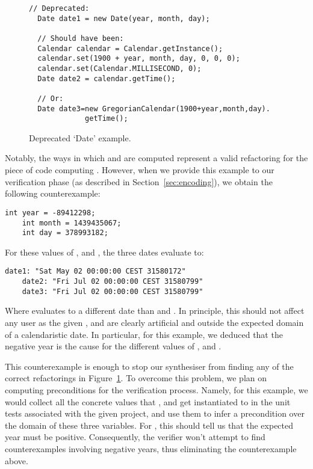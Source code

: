 \documentclass[sigconf,review,anonymous]{acmart}
\begin{document}
\begin{figure}
  \begin{lstlisting}[mathescape=true,showstringspaces=false]
  // Deprecated:
  Date date1 = new Date(year, month, day);

  // Should have been:
  Calendar calendar = Calendar.getInstance();
  calendar.set(1900 + year, month, day, 0, 0, 0);
  calendar.set(Calendar.MILLISECOND, 0);
  Date date2 = calendar.getTime();
    
  // Or:
  Date date3=new GregorianCalendar(1900+year,month,day).
             getTime();
  \end{lstlisting}
\caption{Deprecated `Date' example.}
\label{ex:three-dates}
\end{figure}

Notably, the ways in which  and  are computed
represent a valid refactoring for the piece of code computing
. However, when we provide this example to our
verification phase (as described in Section~\ref{sec:encoding}), we obtain the following
counterexample:

  \begin{lstlisting}[mathescape=true,showstringspaces=false]
    int year = -89412298;
    int month = 1439435067;
    int day = 378993182;
  \end{lstlisting}

  For these values of ,  and , the three
  dates evaluate to:

  \begin{lstlisting}[mathescape=true,showstringspaces=false]
    date1: "Sat May 02 00:00:00 CEST 31580172"
    date2: "Fri Jul 02 00:00:00 CEST 31580799"
    date3: "Fri Jul 02 00:00:00 CEST 31580799"
  \end{lstlisting}

  Where  evaluates to a different date than  and . In principle, this should not affect any user as the given
  ,  and  are clearly artificial and outside the expected domain of a calendaristic date.
  In particular, for this example, we deduced that the negative year is the cause for the different values of ,  and .

  This counterexample is enough to stop our synthesiser from finding any of the correct refactorings in Figure~\ref{ex:three-dates}.
  To overcome this problem, we plan on computing preconditions for the verification process. Namely, for this example, we would collect all the concrete values that
  ,  and  get instantiated to in the unit tests associated with the given project, and use them to
  infer a precondition over the domain of these three variables. For , this should tell us that the expected year must be positive.
  Consequently, the verifier won't attempt to find counterexamples involving negative years, thus eliminating the counterexample above.
\end{document}

